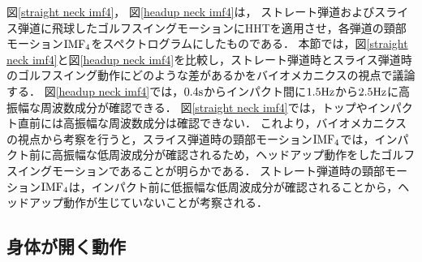 図\ref{straight neck imf4}，
図\ref{headup neck imf4}は，
ストレート弾道およびスライス弾道に飛球したゴルフスイングモーションにHHTを適用させ，各弾道の頸部モーション${\rm{IMF}}_{4}$をスペクトログラムにしたものである．
本節では，図\ref{straight neck imf4}と図\ref{headup neck imf4}を比較し，ストレート弾道時とスライス弾道時のゴルフスイング動作にどのような差があるかをバイオメカニクスの視点で議論する．
図\ref{headup neck imf4}では，$0.4\rm{s}$からインパクト間に$1.5\rm{Hz}$から$2.5\rm{Hz}$に高振幅な周波数成分が確認できる．
図\ref{straight neck imf4}では，トップやインパクト直前には高振幅な周波数成分は確認できない．
これより，バイオメカニクスの視点から考察を行うと，スライス弾道時の頸部モーション${\rm{IMF}}_{4}$では，インパクト前に高振幅な低周波成分が確認されるため，ヘッドアップ動作をしたゴルフスイングモーションであることが明らかである．
ストレート弾道時の頸部モーション${\rm{IMF}}_{4}$は，インパクト前に低振幅な低周波成分が確認されることから，ヘッドアップ動作が生じていないことが考察される．

\subsection{身体が開く動作}


